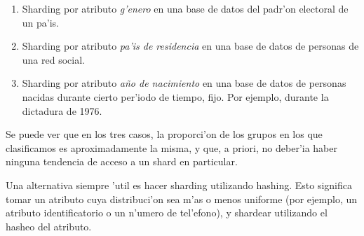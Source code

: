 \begin{enumerate}
	\item Sharding por atributo \emph{g'enero} en una base de datos del padr'on electoral de un pa'is.
	\item Sharding por atributo \emph{pa'is de residencia} en una base de datos de personas de una red social.
	\item Sharding por atributo \emph{a\~no de nacimiento} en una base de datos de personas nacidas durante cierto per'iodo de tiempo, fijo. Por ejemplo, durante la dictadura de 1976.
\end{enumerate}

Se puede ver que en los tres casos, la proporci'on de los grupos en los que clasificamos es aproximadamente la misma, y que, a priori, no deber'ia haber ninguna tendencia de acceso a un shard en particular.

Una alternativa siempre 'util es hacer sharding utilizando hashing. Esto significa tomar un atributo cuya distribuci'on sea m'as o menos uniforme (por ejemplo, un atributo identificatorio o un n'umero de tel'efono), y shardear utilizando el hasheo del atributo. 